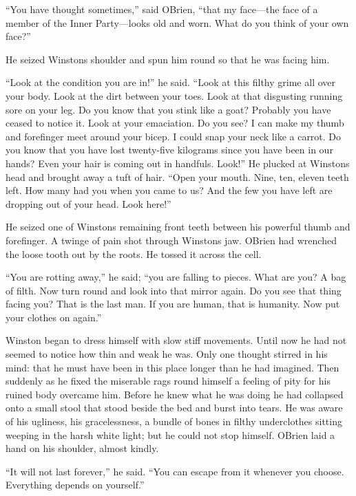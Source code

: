 ``You have thought sometimes,'' said O\textquotesingle Brien, ``that my
face---the face of a member of the Inner Party---looks old and worn.
What do you think of your own face?''

He seized Winston\textquotesingle s shoulder and spun him round so that
he was facing him.

``Look at the condition you are in!'' he said. ``Look at this filthy grime
all over your body. Look at the dirt between your toes. Look at that
disgusting running sore on your leg. Do you know that you stink like a
goat? Probably you have ceased to notice it. Look at your emaciation. Do
you see? I can make my thumb and forefinger meet around your bicep. I
could snap your neck like a carrot. Do you know that you have lost
twenty-five kilograms since you have been in our hands? Even your hair
is coming out in handfuls. Look!'' He plucked at
Winston\textquotesingle s head and brought away a tuft of hair. ``Open
your mouth. Nine, ten, eleven teeth left. How many had you when you came
to us? And the few you have left are dropping out of your head. Look
here!''

He seized one of Winston\textquotesingle s remaining front teeth between
his powerful thumb and forefinger. A twinge of pain shot through
Winston\textquotesingle s jaw. O\textquotesingle Brien had wrenched the
loose tooth out by the roots. He tossed it across the cell.

``You are rotting away,'' he said; ``you are falling to pieces. What are
you? A bag of filth. Now turn round and look into that mirror again. Do
you see that thing facing you? That is the last man. If you are human,
that is humanity. Now put your clothes on again.''

Winston began to dress himself with slow stiff movements. Until now he
had not seemed to notice how thin and weak he was. Only one thought
stirred in his mind: that he must have been in this place longer than he
had imagined. Then suddenly as he fixed the miserable rags round himself
a feeling of pity for his ruined body overcame him. Before he knew what
he was doing he had collapsed onto a small stool that stood beside the
bed and burst into tears. He was aware of his ugliness, his
gracelessness, a bundle of bones in filthy underclothes sitting weeping
in the harsh white light; but he could not stop himself.
O\textquotesingle Brien laid a hand on his shoulder, almost kindly.

``It will not last forever,'' he said. ``You can escape from it whenever
you choose. Everything depends on yourself.''

